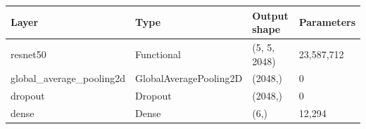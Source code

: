 \begin{tabular}{llll}
\toprule
Layer & Type & Output shape & Parameters \\
\midrule
resnet50 & Functional & (5, 5, 2048) & 23,587,712 \\
global\_average\_pooling2d & GlobalAveragePooling2D & (2048,) & 0 \\
dropout & Dropout & (2048,) & 0 \\
dense & Dense & (6,) & 12,294 \\
\bottomrule
\end{tabular}
